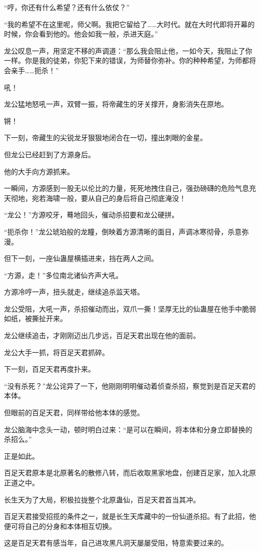 \begin{this_body}
“哼，你还有什么希望？还有什么依仗？”

“我的希望不在这里呢，师父啊。我把它留给了……大时代。就在大时代即将开幕的时候，你会看到他的。他会如我一般，杀进天庭。”

龙公叹息一声，用坚定不移的声调道：“那么我会阻止他，一如今天，我阻止了你一样。你是我的徒弟，你犯下来的错误，为师替你弥补。你的种种希望，为师都将会亲手……扼杀！”

吼！

龙公猛地怒吼一声，双臂一振，将帝藏生的牙关撑开，身影消失在原地。

锵！

下一刻，帝藏生的尖锐龙牙狠狠地闭合在一切，撞出刺眼的金星。

但龙公已经赶到了方源身后。

他的大手向方源抓来。

一瞬间，方源感到一股无以伦比的力量，死死地拽住自己，强劲磅礴的危险气息充天彻地，宛若海啸一般，要从自己的身后将自己彻底淹没！

“龙公！”方源咬牙，蓦地回头，催动杀招要和龙公硬拼。

“扼杀你！”龙公琥珀般的龙瞳，倒映着方源清晰的面目，声调冰寒彻骨，杀意弥漫。

但下一刻，一座仙蛊屋横插进来，挡在两人之间。

“方源，走！”多位南北诸仙齐声大吼。

方源冷哼一声，扭头就走，继续追杀监天塔。

龙公受阻，大吼一声，杀招催动而出，双爪一撕！坚厚无比的仙蛊屋在他手中脆弱如纸，被撕扯开来。

龙公继续追击，才刚刚迈出几步远，百足天君出现在他的面前。

龙公大手一抓，将百足天君抓碎。

下一刻，百足天君再度扑来。

“没有杀死？”龙公诧异了一下，他刚刚明明催动着侦查杀招，察觉到是百足天君的本体。

但眼前的百足天君，同样带给他本体的感觉。

龙公脑海中念头一动，顿时明白过来：“是可以在瞬间，将本体和分身立即替换的杀招么。”

正是如此。

百足天君原本是北原著名的散修八转，而后收取黑家地盘，创建百足家，加入北原正道之中。

长生天为了大局，积极拉拢整个北原蛊仙，百足天君首当其冲。

百足天君接受招揽的条件之一，就是长生天库藏中的一份仙道杀招。有了此招，他便可将自己的分身和本体相互切换。

这是百足天君有感当年，自己进攻黑凡洞天屡屡受阻，特意索要过来的。


\end{this_body}
